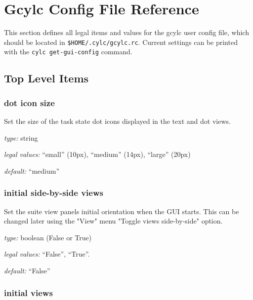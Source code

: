 
\section{Gcylc Config File Reference}
\label{GcylcRCReference}

\lstset{language=bash}

This section defines all legal items and values for the gcylc user
config file, which should be located in
\lstinline=$HOME/.cylc/gcylc.rc=.
Current settings can be printed with the \lstinline=cylc get-gui-config=
command.

\subsection{Top Level Items}

\subsubsection{dot icon size}

Set the size of the task state dot icons displayed in the text and dot
views.

\begin{myitemize}
\item {\em type:} string
\item {\em legal values:} ``small'' (10px), ``medium'' (14px), ``large'' (20px)
\item {\em default:} ``medium''
\end{myitemize}


\subsubsection{initial side-by-side views}

Set the suite view panels initial orientation when the GUI starts.
This can be changed later using the "View" menu "Toggle views side-by-side"
 option.

\begin{myitemize}
\item {\em type:} boolean (False or True)
\item {\em legal values:} ``False'', ``True''.
\item {\em default:} ``False''
\end{myitemize}


\subsubsection{initial views}


